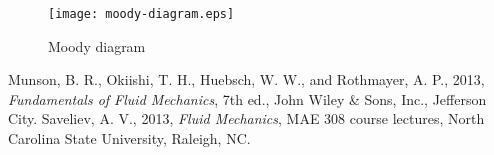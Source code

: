 \documentclass{article}
\begin{document}
\begin{figure}
  \centering
  \texttt{[image: moody-diagram.eps]}
  \caption{Moody diagram}
  \label{fig:moody}
\end{figure}

\begin{thebibliography}{99}
 Munson, B. R., Okiishi, T. H., Huebsch, W. W., and Rothmayer, A. P., 2013,
  \emph{Fundamentals of Fluid Mechanics}, 7th ed., John Wiley \& Sons, Inc., Jefferson City.
 Saveliev, A. V., 2013, \emph{Fluid Mechanics}, MAE 308 course lectures, North
  Carolina State University, Raleigh, NC.
\end{thebibliography}
\end{document}
